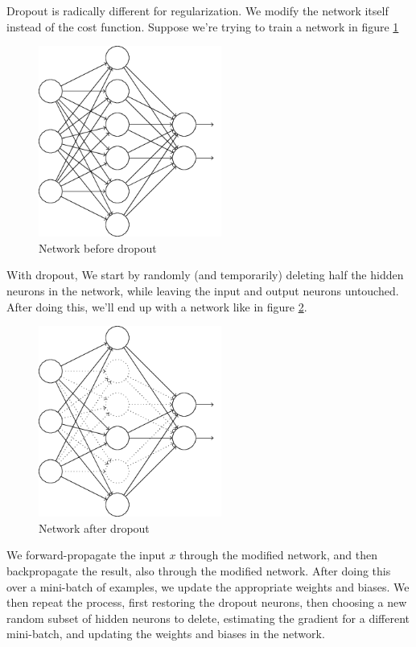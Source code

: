 \documentclass[a4paper]{tufte-handout}
\begin{document}
Dropout is radically different for regularization. We modify the network
itself instead of the cost function. Suppose we're trying to train a
network in figure \ref{fig:dropout1}

\begin{figure}[!hbt]
\includegraphics[width=60mm]{dropout1.png}
\caption{Network before dropout}
\label{fig:dropout1}
\end{figure}


With dropout, We start by randomly (and temporarily) deleting half the
hidden neurons in the network, while leaving the input and output
neurons untouched. After doing this, we'll end up with a network like in figure \ref{fig:dropout2}.


\begin{figure}[!hbt]
\includegraphics[width=60mm]{dropout2.png}
\caption{Network after dropout}
\label{fig:dropout2}
\end{figure}


We forward-propagate the input \(x\) through the modified network, and
then backpropagate the result, also through the modified network. After
doing this over a mini-batch of examples, we update the appropriate
weights and biases. We then repeat the process, first restoring the
dropout neurons, then choosing a new random subset of hidden neurons to
delete, estimating the gradient for a different mini-batch, and updating
the weights and biases in the network.
\end{document}
